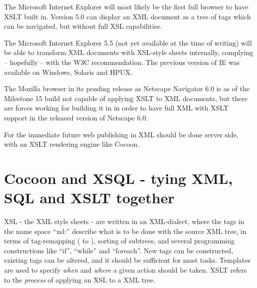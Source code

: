 The Microsoft Internet Explorer will most likely be the first full
browser to have XSLT built in.  Version 5.0 can display an XML
document as a tree of tags which can be navigated, but without full
XSL capabilities.

The Microsoft Internet Explorer 5.5 (not yet available at the time of
writing) will be able to transform XML documents with XSL-style sheets
internally, complying -- hopefully -- with the W3C recommendation.
The previous version of IE was available on Windows, Solaris and HPUX.

The Mozilla browser in its pending release as Netscape Navigator 6.0
is as of the Milestone 15 build not capable of applying XSLT to XML
documents, but there are forces working for building it in in order to
have full XML with XSLT support in the released version of Netscape
6.0.

For the immediate future web publishing in XML should be done server
side, with an XSLT rendering engine like Cocoon.


%
%
%
%
%

\section{Cocoon and XSQL - tying XML, SQL and XSLT together }


XSL - the XML style sheets - are written in an XML-dialect, where the
tags in the name space ``xsl:'' describe what is to be done with the
source XML tree, in terms of tag-remapping ( to ),
sorting of subtrees, and several programming constructions like
``if'', ``while'' and ``foreach''.  New tags can be constructed,
existing tags can be altered, and it should be sufficient for most
tasks.  Templates are used to specify \textit{when} and \textit{where}
a given action should be taken.   XSLT refers to the \textit{process}
of applying an XSL to a XML tree.


